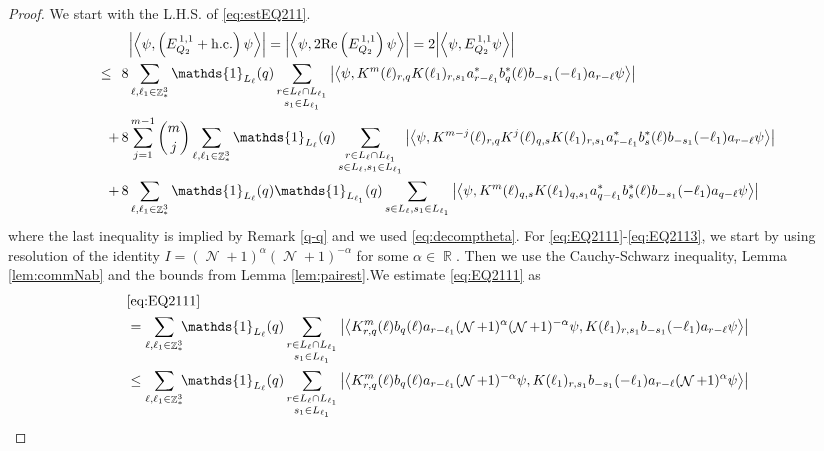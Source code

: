 \documentclass[sn-mathphys, Numbered ,a4paper]{sn-jnl}%
\DeclareMathOperator{\R}{\mathbb{R}}
\DeclareMathOperator{\Z}{\mathbb{Z}}
\DeclareMathOperator{\NN}{\mathcal{N}}
\newcommand{\eva}[1]{\left\langle #1 \right\rangle}
\theoremstyle{plain}
\theoremstyle{definition}
\theoremstyle{remark}
\theoremstyle{plain}
\theoremstyle{definition}
\theoremstyle{remark}
\begin{document}
\begin{proof}
  We start with the L.H.S. of \eqref{eq:estEQ211}.
  \begin{align}
  	&\abs{\eva{\psi,\left(E^{\,1,1}_{Q_2}+\mathrm{h.c.}\right) \psi }} = \abs{\eva{\psi,2\mathrm{Re}\left(E^{\,1,1}_{Q_2}\right) \psi }} = 2\abs{\eva{\psi, E^{\,1,1}_{Q_2} \psi }}\nonumber\\
  	\leq\,\;8& \sum\limits_{\ell, \ell_1\in \Z^3_*} \mathds{1}_{L_{\ell}}(q) \sum\limits_{\substack{r\in L_{\ell} \cap L_{\ell_1}\\s_1\in L_{\ell_1}}} \abs{\eva{\psi, K^m(\ell )_{r,q} K(\ell_1)_{r,s_1} a^*_{r-\ell_1} b^*_{q}(\ell) b_{-s_1}(-\ell_1) a_{r-\ell}  \psi }}\label{eq:EQ2111}\\
  	+\,8& \sum\limits_{j=1}^{m-1} {{m}\choose j} \sum\limits_{\ell, \ell_1\in \Z^3_*}\mathds{1}_{L_{\ell}}(q) \sum\limits_{\substack{r\in L_{\ell} \cap L_{\ell_1}\\ s \in L_{\ell},s_1\in L_{\ell_1}}}  \abs{\eva{\psi, K^{m-j}(\ell)_{r,q} K^{j}(\ell)_{q,s} K(\ell_1)_{r,s_1} a^*_{r-\ell_1} b^*_{s}(\ell) b_{-s_1}(-\ell_1) a_{r-\ell} \psi }}\label{eq:EQ2112}\\
  	+\,8&\sum\limits_{\ell, \ell_1\in \Z^3_*} \mathds{1}_{L_{\ell}}(q) \mathds{1}_{L_{\ell_1}}(q) \sum\limits_{s \in L_{\ell},s_1\in L_{\ell_1}} \abs{\eva{\psi,  K^m(\ell)_{q,s}K(\ell_1)_{q,s_1}
  	a^*_{q-\ell_1} b^*_{s}(\ell) b_{-s_1}(-\ell_1) a_{q-\ell} \psi}} \label{eq:EQ2113}
  \end{align}
  where the last inequality is implied by Remark \ref{q-q} and we used \eqref{eq:decomptheta}.
  For \eqref{eq:EQ2111}-\eqref{eq:EQ2113}, we start by using resolution of the identity $I = (\NN+1)^{\alpha}(\NN+1)^{-\alpha}$ for some $\alpha \in \R$. Then we use the Cauchy-Schwarz inequality, Lemma \ref{lem:commNab} and the bounds from Lemma \ref{lem:pairest}.We estimate \eqref{eq:EQ2111} as
  \begin{align}
  	&\eqref{eq:EQ2111}\nonumber\\
  	&= \sum\limits_{\ell,\ell_1 \in \Z^3_*}\!\! \mathds{1}_{L_\ell}(q) \sum\limits_{\substack{r \in L_\ell \cap L_{\ell_1}\\ s_1 \in L_{\ell_1}}} \abs{\eva{ K^{m}_{r,q}(\ell) b_{q}(\ell) a_{r-\ell_1} (\NN+1)^{\alpha} (\NN+1)^{-\alpha} \psi, K(\ell_1)_{r,s_1} b_{-s_1}(-\ell_1) a_{r-\ell} \psi}}\nonumber\\
  	&\leq \sum\limits_{\ell,\ell_1 \in \Z^3_*} \!\!\mathds{1}_{L_\ell}(q) \sum\limits_{\substack{r \in L_\ell \cap L_{\ell_1}\\ s_1 \in L_{\ell_1}}} \abs{\eva{ K^{m}_{r,q}(\ell) b_{q}(\ell) a_{r-\ell_1} (\NN+1)^{-\alpha} \psi, K(\ell_1)_{r,s_1} b_{-s_1}(-\ell_1) a_{r-\ell} (\NN+1)^{\alpha} \psi }}\nonumber\\

\end{align}
\end{proof}
\end{document}
